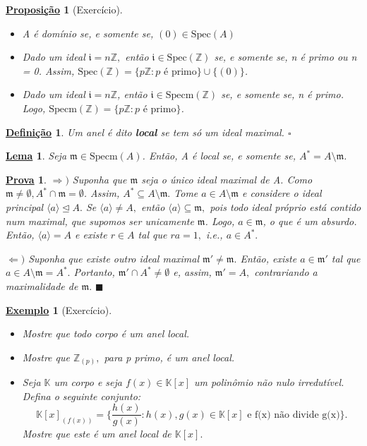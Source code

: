 \documentclass{article}
\newtheorem*{def*}{\underline{Defini\c c\~ao}}
\newtheorem*{lemma*}{\underline{Lema}}
\newtheorem*{prop*}{\underline{Proposi\c c\~ao}}
\newtheorem{example}{\underline{Exemplo}}
\newtheorem*{proof*}{\underline{Prova}}
\renewcommand\qedsymbol{$\blacksquare$}
\begin{document}
\begin{prop*}[Exercício]
  \begin{itemize}
    \item[1)] A é domínio se, e somente se, \((0)\in \mathrm{Spec}(A)\)
    \item[2)] Dado um ideal \(\mathfrak{i} = n \mathbb{Z},\) então \(\mathfrak{i}\in \mathrm{Spec}(\mathbb{Z})\) se, e somente se,
      n é primo ou n = 0. Assim, \(\mathrm{Spec}(\mathbb{Z}) = \{p \mathbb{Z}: p \text{ é primo}\}\cup \{(0)\}\).
    \item[3)] Dado um ideal \(\mathfrak{i} = n \mathbb{Z}\), então \(\mathfrak{i}\in \mathrm{Specm}(\mathbb{Z})\) se, e somente se,
      n é primo. Logo, \(\mathrm{Specm}(\mathbb{Z}) = \{p \mathbb{Z}:p \text{ é primo}\}\).
  \end{itemize}
\end{prop*}
\begin{def*}
  Um anel é dito \textbf{local} se tem só um ideal maximal. \(\square\)
\end{def*}
\begin{lemma*}
  Seja \(\mathfrak{m}\in \mathrm{Specm}(A)\). Então, A é local se, e somente se, \(A^{*} = A\setminus{\mathfrak{m}}\).
\end{lemma*}
\begin{proof*}
  \(\Rightarrow )\) Suponha que \(\mathfrak{m}\) seja o único ideal maximal de A. Como \(\mathfrak{m} \neq\emptyset, A^{*}\cap \mathfrak{m} = \emptyset\).
  Assim, \(A^{*}\subseteq{A\setminus{\mathfrak{m}}}.\) Tome \(a\in A\setminus{\mathfrak{m}}\) e considere o ideal principal \(\langle a \rangle \trianglelefteq{A}.\)
  Se \(\langle a \rangle\neq A,\) então \(\langle a \rangle \subseteq{\mathfrak{m}},\) pois todo ideal próprio está contido num maximal, que supomos ser unicamente \(\mathfrak{m}\).
  Logo, \(a\in \mathfrak{m}\), o que é um absurdo. Então, \(\langle a \rangle = A\) e existe \(r\in A\) tal que \(ra = 1,\) i.e., \(a\in A^{*}.\)

  \(\Leftarrow )\) Suponha que existe outro ideal maximal \(\mathfrak{m}'\neq \mathfrak{m}.\) Então, existe \(a\in \mathfrak{m}'\)
  tal que \(a\in A\setminus{\mathfrak{m}} = A^{*}.\) Portanto, \(\mathfrak{m}'\cap A^{*} \neq\emptyset\) e, assim, \(\mathfrak{m}' = A,\)
  contrariando a maximalidade de \(\mathfrak{m}.\) \qedsymbol
\end{proof*}
\begin{example}[Exercício]
  \begin{itemize}
    \item[1)] Mostre que todo corpo é um anel local.
    \item[2)] Mostre que \(\mathbb{Z}_{(p)},\) para p primo, é um anel local.
    \item[3)] Seja \(\mathbb{K}\) um corpo e seja \(f(x)\in \mathbb{K}[x]\) um polinômio não nulo irredutível.
      Defina o seguinte conjunto:
      \[
        \mathbb{K}[x]_{(f(x))} = \biggl\{\frac{h(x)}{g(x)}: h(x), g(x)\in \mathbb{K}[x] \text{ e f(x) não divide g(x)}\biggr\}.
      \]
      Mostre que este é um anel local de \(\mathbb{K}[x].\)
  \end{itemize}
\end{example}
\end{document}
